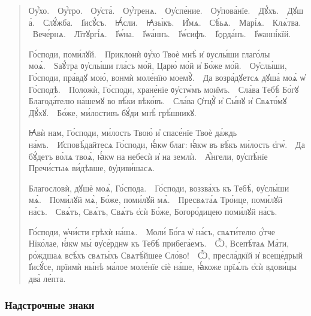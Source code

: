 \documentclass[11pt,a4paper,oneside]{memoir}
\newcommand{\exquote}{quote}
\newcommand{\sdash}{\textenglish{\textemdash}}
\begin{document}
        \begin{\exquote}
          \begin{slv}
            Оу҆́хо.~\sdash~Оу҆́тро.~\sdash~Оу҆ста̀.~\sdash~Оу҆́тренѧ.~\sdash~Оу҆спе́ние.~\sdash~Оу҆пова́нїе.~\sdash~Дꙋ́хъ.~\sdash~Дꙋша̀.~\sdash~Слꙋ́жба.~\sdash~І҆исꙋ́съ.~\sdash~Ꙗ҆́сли.~\sdash~Ꙗ҆зы́къ.~\sdash~И҆́мѧ.~\sdash~Сѣ́ьѧ.~\sdash~Марі́ѧ.~\sdash~Клѧ́тва.~\sdash~Вече́рнѧ.~\sdash~Лїтꙋргі́ѧ.~\sdash~І҆ѡ́на.~\sdash~І҆ѡа́ннъ.~\sdash~І҆ѡ́сифъ.~\sdash~І҆ѻрда́нъ.~\sdash~І҆ѡанні́кїй.

            Го́споди, поми́лꙋй.~\sdash~Приклонѝ ᲂу҆́хо Твоѐ мнѣ̀ и҆
            ᲂуслы́ши глаго́лы моѧ̀.~\sdash~Ѕаꙋ́тра ᲂу҆слы́ши гла́съ
            мо́й, Царю̀ мо́й и҆ Бо́же мо́й.~\sdash~Оу҆слы́ши,
            Го́споди, пра́вдꙋ мою̀, вонмѝ моле́нїю
            моемꙋ̀.~\sdash~Да возра́дꙋетсѧ дꙋша̀ моѧ̀ ѡ҆
            Го́сподѣ.~\sdash~Положѝ, Го́споди, хране́нїе ᲂу҆стѡ́мъ
            мои̑мъ.~\sdash~Сла́ва Тебѣ̀ Бо́гꙋ Благода́телю на́шемꙋ во
            вѣ́ки вѣко́въ.~\sdash~Сла́ва Ѻ҆тцꙋ̀ и҆ Сы́нꙋ и҆ Свѧто́мꙋ
            Дꙋ́хꙋ.~\sdash~Бо́же, ми́лостивъ бꙋ́ди мнѣ̀ грѣ́шникꙋ.

            Ꙗ҆вѝ нам, Го́споди, ми́лость Твою̀ и҆ спасе́нїе Твоѐ
            да́ждь на́мъ.~\sdash~И҆сповѣ́дайтесѧ Го́споди, ꙗ҆́кѡ
            благ: ꙗ҆́кѡ въ вѣ́къ ми́лость є҆гѡ́.~\sdash~Да бꙋ́детъ
            во́лѧ твоѧ̀, ꙗ҆́кѡ на небесѝ и҆ на
            землѝ.~\sdash~А҆́нгели, ᲂу҆спѣ́нїе Пречи́стыѧ ви́дѣвше,
            ᲂу҆диви́шасѧ.

            Благословѝ, дꙋшѐ моѧ̀, Го́спода.~\sdash~Го́споди,
            воззва́хъ къ Тебѣ̀, ᲂу҆слы́ши мѧ̀.~\sdash~Поми́лꙋй мѧ̀,
            Бо́же, поми́лꙋй мѧ̀.~\sdash~Пресвѧта́ѧ Тро́ице, поми́лꙋй
            на́съ.~\sdash~Свѧ́тъ, Свѧ́тъ, Свѧ́тъ є҆сѝ Бо́же,
            Богоро́дицею поми́лꙋй на́съ.

            Го́споди, ѡ҆чи́сти грѣхѝ на́шѧ.~\sdash~Моли́ Бо́га ѡ҆
            на́съ, свѧти́телю ѻ҆́тче Нїко́лае, ꙗ҆́кѡ мы̀ ᲂу҆се́рднѡ
            къ Тебѣ̀ прибега́емъ.~\sdash~Ѽ, Всепѣ́таѧ Ма́ти, ро́ждшаѧ
            всѣ́хъ свѧты́хъ Свѧтѣ́йшее Сло́во!~\sdash~Ѽ, пресла́дкїй
            и҆ всеще́дрый І҆исꙋ́се, прїимѝ ны́нѣ ма́лое моле́нїе
            сїѐ на́ше, ꙗ҆́коже прїѧ́лъ є҆сѝ вдови́цы два̀ ле́пта.
          \end{slv}
        \end{\exquote}

        \subsubsection{Надстрочные знаки}
\end{document}

